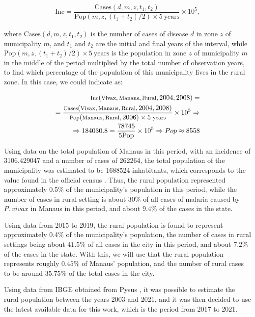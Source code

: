 \documentclass[a4paper,fleqn]{cas-dc}
\begin{document}
\begin{align}
\text{Inc} = %
\dfrac{\text{Cases}(d, m, z, t_1, t_2)}{\text{Pop}(m,z,(t_1+t_2)/2) \times 5 \ \text{years}} \times 10^5,
\end{align}

where $\text{Cases}(d, m, z, t_1, t_2)$ is the number of cases of disease $d$ in zone $z$ of municipality 
$m$, and $t_1$ and $t_2$ are the initial and final years of the interval, while 
$\text{Pop}(m,z,(t_1+t_2)/2) \times 5 \ \text{years}$ is the population in zone $z$ 
of municipality $m$ in the middle of the period multiplied by the total number 
of observation years, to find which percentage of the population of this municipality lives in the rural zone. In this case, we could indicate as:

\begin{align}
    \footnotesize{\text{Inc}(\text{Vivax}, \text{Manaus}, \text{Rural}, 2004, 2008) = } \\
= \footnotesize{\dfrac{\text{Cases}(\text{Vivax}, \text{Manaus}, \text{Rural}, 2004, 2008)}{\text{Pop}(\text{Manaus}, \text{Rural}, 2006) \times 5 \ \text{years}} \times 10^5} \Rightarrow  \\
    \Rightarrow 184030.8 = \dfrac{78745}{5\text{Pop}} \times 10^5 \Rightarrow Pop \approx 8558
\end{align}

Using data on the total population of Manaus in this period, 
with an incidence of 3106.429047 and a number of cases of 262264, the 
total population of the municipality was estimated to be 1688524 
inhabitants, which corresponds to the value found in the official census \cite{Datasus2006}. Thus, the rural population represented 
approximately 0.5$\%$ of the municipality's population in this period, while the number of cases in rural setting is about $30\%$ of all cases of malaria caused by $P. \ vivax$ in Manaus in this 
period, and about $9.4\%$ of the cases in the state.

Using data from 2015 to 2019, the rural population is found to represent  
approximately 0.4$\%$ of the municipality's population, the number of cases in rural settings being about $41.5\%$ of all cases in the city in this 
period, and about $7.2\%$ of the cases in the state. With this, we will use that the rural population represents roughly $0.45\%$ of Manaus' population, 
and the number of rural cases to be around $35.75\%$ of the total cases in the city.

Using data from IBGE obtained from Pysus \cite{Pysus},  %
it was possible to estimate the rural population between the years 2003 and 2021, and it was then decided to 
use the latest available data for this work, which is the period from 2017 to 2021.
\end{document}
